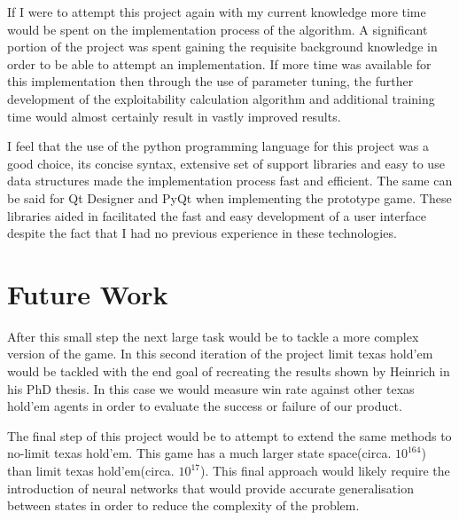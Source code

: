 If I were to attempt this project again with my current knowledge more time would be spent on the
implementation process of the algorithm.
A significant portion of the project was spent gaining the requisite background knowledge
in order to be able to attempt an implementation.
If more time was available for this implementation then through the use of parameter tuning,
the further development of the exploitability calculation algorithm and additional training
time would almost certainly result in vastly improved results.

I feel that the use of the python programming language for this project was a good choice,
its concise syntax, extensive set of support libraries and easy to use data structures
made the implementation process fast and efficient.
The same can be said for Qt Designer and PyQt when implementing the prototype game.
These libraries aided in facilitated the fast and easy development of a user interface despite the fact
that I had no previous experience in these technologies.

\section{Future Work}\label{sec:futureWork}

After this small step the next large task would be to tackle a more complex version of the game.
In this second iteration of the project limit texas hold'em would be tackled with the end goal of recreating
the results shown by Heinrich in his PhD thesis\citep{heinrich2017reinforcement}.
In this case we would measure win rate against other texas hold'em agents in order to evaluate
the success or failure of our product.

The final step of this project would be to attempt to extend the same methods to no-limit texas hold'em.
This game has a much larger state space(circa. $10^{164}$) than limit texas hold'em(circa. $10^{17}$).
This final approach would likely require the introduction of neural networks that would provide accurate
generalisation between states in order to reduce the complexity of the problem.